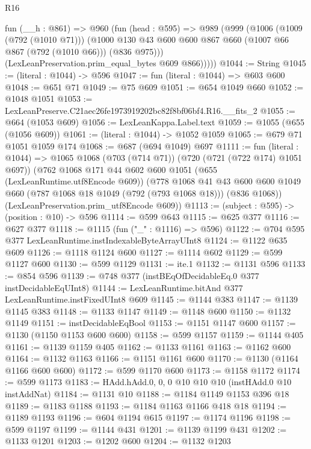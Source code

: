 \begin{lexlean}{R16}
\begin{coremodule}
      fun (__h : @861) =>
      @960
        (fun (head : @595) =>
        @989
          (@999
            (@1006
              (@1009 (@792 (@1010 @71)))
              (@1000 @130 @43 @600 @600 @867 @660 (@1007 @66 @867 (@792 (@1010 @66))) (@836 @975)))
            (LexLeanPreservation.prim_equal_bytes @609 @866)))))
@1044 := String
@1045 := (literal : @1044) -> @596
@1047 := fun (literal : @1044) => @603 @600
@1048 := @651 @71
@1049 := @75 @609
@1051 := @654 @1049 @660
@1052 := @1048 @1051
@1053 := LexLeanPreserve.C21aec26fe1973919202bc82f8bf06bf4.R16.__fits_2
@1055 := @664 (@1053 @609)
@1056 := LexLeanKappa.Label.text
@1059 := @1055 (@655 (@1056 @609))
@1061 := (literal : @1044) -> @1052 @1059
@1065 := @679 @71 @1051 @1059 @174
@1068 := @687 (@694 @1049) @697
@1111 := fun (literal : @1044) =>
  @1065
    @1068
    (@703 (@714 @71))
    (@720 (@721 (@722 @174) @1051 @697))
    (@762
      @1068
      @171
      @44
      @602
      @600
      @1051
      (@655 (LexLeanRuntime.utf8Encode @609))
      (@778
        @1068
        @41
        @43
        @600
        @600
        @1049
        @660
        (@787 @1068 @18 @1049 (@792 (@793 @1068 @18)))
        (@836 @1068))
      (LexLeanPreservation.prim_utf8Encode @609))
@1113 := (subject : @595) -> (position : @10) -> @596
@1114 := @599 @643
@1115 := @625 @377
@1116 := @627 @377
@1118 := @1115 (fun ("_" : @1116) => @596)
@1122 := @704 @595 @377 LexLeanRuntime.instIndexableByteArrayUInt8
@1124 := @1122 @635 @609
@1126 := @1118 @1124 @600
@1127 := @1114 @602
@1129 := @599 @1127 @600
@1130 := @599 @1129
@1131 := ite.{1}
@1132 := @1131 @596
@1133 := @854 @596
@1139 := @748 @377 (instBEqOfDecidableEq.{0} @377 instDecidableEqUInt8)
@1144 := LexLeanRuntime.bitAnd @377 LexLeanRuntime.instFixedUInt8 @609
@1145 := @1144 @383
@1147 := @1139 @1145 @383
@1148 := @1133 @1147
@1149 := @1148 @600
@1150 := @1132 @1149
@1151 := instDecidableEqBool
@1153 := @1151 @1147 @600
@1157 := @1130 (@1150 @1153 @600 @600)
@1158 := @599 @1157
@1159 := @1144 @405
@1161 := @1139 @1159 @405
@1162 := @1133 @1161
@1163 := @1162 @600
@1164 := @1132 @1163
@1166 := @1151 @1161 @600
@1170 := @1130 (@1164 @1166 @600 @600)
@1172 := @599 @1170 @600
@1173 := @1158 @1172
@1174 := @599 @1173
@1183 := HAdd.hAdd.{0, 0, 0} @10 @10 @10 (instHAdd.{0} @10 instAddNat)
@1184 := @1131 @10
@1188 := @1184 @1149 @1153 @396 @18
@1189 := @1183 @1188
@1193 := @1184 @1163 @1166 @418 @18
@1194 := @1189 @1193
@1196 := @604 @1194 @615
@1197 := @1174 @1196
@1198 := @599 @1197
@1199 := @1144 @431
@1201 := @1139 @1199 @431
@1202 := @1133 @1201
@1203 := @1202 @600
@1204 := @1132 @1203

\end{coremodule}
\end{lexlean}
